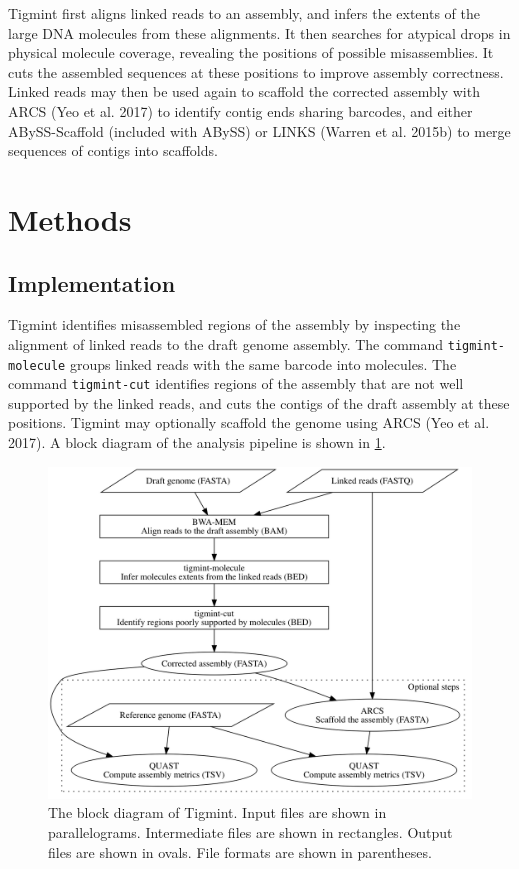 \documentclass[
  12pt,
  oneside,
  openany]{book}
\begin{document}
Tigmint first aligns linked reads to an assembly, and infers the extents of the large DNA molecules from these alignments. It then searches for atypical drops in physical molecule coverage, revealing the positions of possible misassemblies. It cuts the assembled sequences at these positions to improve assembly correctness. Linked reads may then be used again to scaffold the corrected assembly with ARCS (Yeo et al. 2017) to identify contig ends sharing barcodes, and either ABySS-Scaffold (included with ABySS) or LINKS (Warren et al. 2015b) to merge sequences of contigs into scaffolds.

\hypertarget{methods-1}{%
\section{Methods}\label{methods-1}}

\hypertarget{implementation}{%
\subsection{Implementation}\label{implementation}}

Tigmint identifies misassembled regions of the assembly by inspecting the alignment of linked reads to the draft genome assembly. The command \texttt{tigmint-molecule} groups linked reads with the same barcode into molecules. The command \texttt{tigmint-cut} identifies regions of the assembly that are not well supported by the linked reads, and cuts the contigs of the draft assembly at these positions. Tigmint may optionally scaffold the genome using ARCS (Yeo et al. 2017). A block diagram of the analysis pipeline is shown in \cref{fig:pipeline}.

\begin{figure}
\hypertarget{fig:pipeline}{%
\centering
\includegraphics[width=6in,height=\textheight]{tigmint/pipeline.png}
\caption[The block diagram of Tigmint.]{The block diagram of Tigmint. Input files are shown in parallelograms. Intermediate files are shown in rectangles. Output files are shown in ovals. File formats are shown in parentheses.}\label{fig:pipeline}
}
\end{figure}
\end{document}

